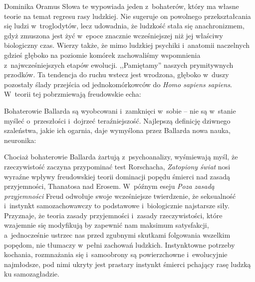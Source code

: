 \begin{artplenv}{Dominika Oramus}
Słowa te wypowiada jeden z~bohaterów, który ma własne teorie na temat regresu rasy ludzkiej. Nie sugeruje on powolnego przekształcania się ludzi w~troglodytów, lecz udowadnia, że ludzkość stała się anachronizmem, gdyż zmuszona jest żyć w~epoce znacznie wcześniejszej niż jej właściwy biologiczny czas. Wierzy także, że mimo ludzkiej psychiki i~anatomii naczelnych gdzieś głęboko na poziomie komórek zachowaliśmy wspomnienia z~najwcześniejszych etapów ewolucji. ,,Pamiętamy'' naszych prymitywnych przodków. Ta tendencja do ruchu wstecz jest wrodzona, głęboko w~duszy pozostały ślady przejścia od jednokomórkowców do \textit{Homo sapiens sapiens}. W~teorii tej pobrzmiewają freudowskie echa:


Bohaterowie Ballarda są wyobcowani i~zamknięci w~sobie -- nie są w~stanie myśleć o~przeszłości i~dojrzeć teraźniejszość. Najlepszą definicję dziwnego szaleństwa, jakie ich ogarnia, daje wymyślona przez Ballarda nowa nauka, neuronika:


Chociaż bohaterowie Ballarda żartują z~psychoanalizy, wyśmiewają myśl, że rzeczywistość zaczyna przypominać test Rorschacha, \textit{Zatopiony świat} nosi wyraźne wpływy freudowskiej teorii dominacji popędu śmierci nad zasadą przyjemności, Thanatosa nad Erosem. W~późnym eseju \textit{Poza zasadą przyjemności}
Freud 
\parencite*[][]{freud_poza_1994} %
odwołuje swoje wcześniejsze twierdzenie, że seksualność i~instynkt samozachowawczy to podstawowe i~biologicznie najstarsze siły. Przyznaje, że teoria zasady przyjemności i~zasady rzeczywistości, które wzajemnie się modyfikują by zapewnić nam maksimum satysfakcji, a~jednocześnie ustrzec nas przed zgubnymi skutkami folgowania wszelkim popędom, nie tłumaczy w~pełni zachowań ludzkich. Instynktowne potrzeby kochania, rozmnażania się i~samoobrony są powierzchowne i~ewolucyjnie najmłodsze, pod nimi ukryty jest prastary instynkt śmierci pchający rasę ludzką ku samozagładzie.


\end{artplenv}
